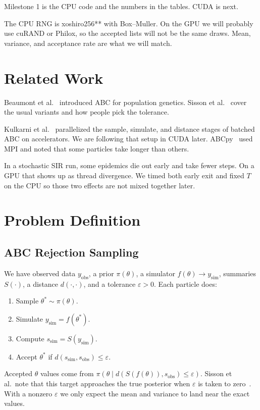 \documentclass[conference]{IEEEtran}
\begin{document}
Milestone 1 is the CPU code and the numbers in the tables. CUDA is next.

The CPU RNG is xoshiro256** with Box--Muller. On the GPU we will probably use
cuRAND or Philox, so the accepted lists will not be the same draws. Mean,
variance, and acceptance rate are what we will match.

\section{Related Work}

Beaumont et al.~\cite{beaumont2002approximate} introduced ABC for population
genetics. Sisson et al.~\cite{sisson2018handbook} cover the usual variants
and how people pick the tolerance.

Kulkarni et al.~\cite{kulkarni2022hardware} parallelized the sample, simulate,
and distance stages of batched ABC on accelerators. We are following that
setup in CUDA later. ABCpy~\cite{dutta2021abcpy} used MPI and noted that some
particles take longer than others.

In a stochastic SIR run, some epidemics die out early and take fewer steps.
On a GPU that shows up as thread divergence. We timed both early exit and
fixed $T$ on the CPU so those two effects are not mixed together later.

\section{Problem Definition}

\subsection{ABC Rejection Sampling}

We have observed data $y_{\mathrm{obs}}$, a prior $\pi(\theta)$, a simulator
$f(\theta) \to y_{\mathrm{sim}}$, summaries $S(\cdot)$, a distance
$d(\cdot, \cdot)$, and a tolerance $\varepsilon > 0$. Each particle does:
\begin{enumerate}
    \item Sample $\theta^* \sim \pi(\theta)$.
    \item Simulate $y_{\mathrm{sim}} = f(\theta^*)$.
    \item Compute $s_{\mathrm{sim}} = S(y_{\mathrm{sim}})$.
    \item Accept $\theta^*$ if
          $d(s_{\mathrm{sim}}, s_{\mathrm{obs}}) \leq \varepsilon$.
\end{enumerate}
Accepted $\theta$ values come from
$\pi(\theta \mid d(S(f(\theta)), s_{\mathrm{obs}}) \leq \varepsilon)$.
Sisson et al.\ note that this target approaches the true posterior when
$\varepsilon$ is taken to zero~\cite{sisson2018handbook}. With a nonzero
$\varepsilon$ we only expect the mean and variance to land near the exact
values.
\end{document}
